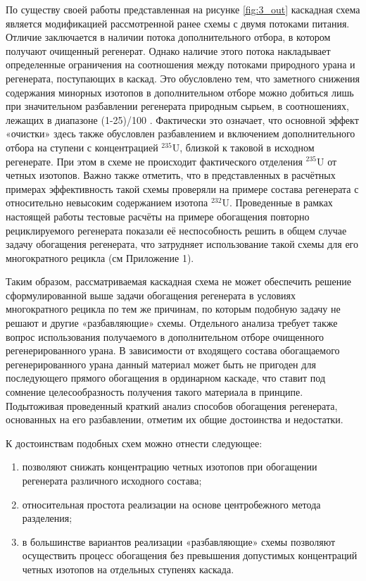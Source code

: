 По существу своей работы представленная на рисунке \ref{fig:3_out} каскадная схема является модификацией рассмотренной ранее схемы с двумя потоками питания. Отличие заключается в наличии потока дополнительного отбора, в котором получают очищенный регенерат. Однако наличие этого потока накладывает определенные ограничения на соотношения между потоками природного урана и регенерата, поступающих в каскад. Это обусловлено тем, что заметного снижения содержания минорных изотопов в дополнительном отборе можно добиться лишь при значительном разбавлении регенерата природным сырьем, в соотношениях, лежащих в диапазоне (1-25)/100 \cite{palkinSeparationUraniumIsotopes2010,smirnovKaskadnyeShemyZadachah2012}. Фактически это означает, что основной эффект «очистки» здесь также обусловлен разбавлением и включением дополнительного отбора на ступени с концентрацией $^{235}$U, близкой к таковой в исходном регенерате. При этом в схеме не происходит фактического отделения $^{235}$U от четных изотопов. Важно также отметить, что в представленных в \cite{palkinSeparationUraniumIsotopes2010} расчётных примерах эффективность такой схемы проверяли на примере состава регенерата с относительно невысоким содержанием изотопа $^{232}$U. Проведенные в рамках настоящей работы тестовые расчёты на примере обогащения повторно рециклируемого регенерата показали её неспособность решить в общем случае задачу обогащения регенерата, что затрудняет использование такой схемы для его многократного рецикла (см Приложение 1).

Таким образом, рассматриваемая каскадная схема не может обеспечить решение сформулированной выше задачи обогащения регенерата в условиях многократного рецикла по тем же причинам, по которым подобную задачу не решают и другие «разбавляющие» схемы. Отдельного анализа требует также вопрос использования получаемого в дополнительном отборе очищенного регенерированного урана. В зависимости от входящего состава обогащаемого регенерированного урана данный материал может быть не пригоден для последующего прямого обогащения в ординарном каскаде, что ставит под сомнение целесообразность получения такого материала в принципе.
Подытоживая проведенный краткий анализ способов обогащения регенерата, основанных на его разбавлении, отметим их общие достоинства и недостатки.

К достоинствам подобных схем можно отнести следующее:

\begin{enumerate}
  \item	позволяют снижать концентрацию четных изотопов при обогащении регенерата различного исходного состава;
  \item	относительная простота реализации на основе центробежного метода разделения;
  \item	в большинстве вариантов реализации «разбавляющие» схемы позволяют осуществить процесс обогащения без превышения допустимых концентраций четных изотопов на отдельных ступенях каскада.
\end{enumerate} 

